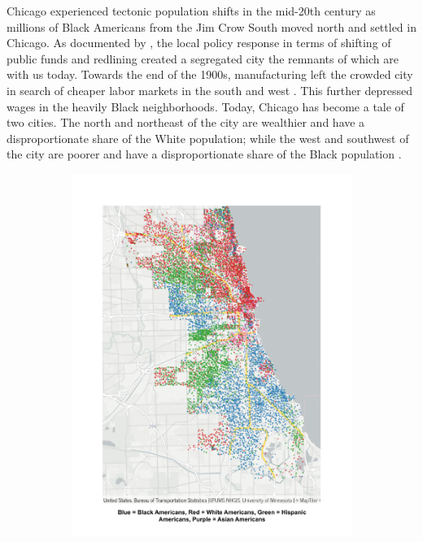 \documentclass[12pt]{article}
\begin{document}
Chicago experienced tectonic population shifts in the mid-20th century as millions of Black Americans from the Jim Crow South moved north and settled in Chicago. As documented by \citet{derenoncourt2022}, the local policy response in terms of shifting of public funds and redlining created a segregated city the remnants of which are with us today. Towards the end of the 1900s, manufacturing left the crowded city in search of cheaper labor markets in the south and west \citep{chicagobrit}. This further depressed wages in the heavily Black neighborhoods. Today, Chicago has become a tale of two cities. The north and northeast of the city are wealthier and have a disproportionate share of the White population; while the west and southwest of the city are poorer and have a disproportionate share of the Black population \citep{southside2022}. 
\begin{figure}[h!]
\centering
    \caption{Population by Race and Income}
    \begin{subfigure}{0.52\textwidth}
         \centering
         \includegraphics[width=\textwidth]{Pset1/Figures/Descriptive/racial_map.pdf}

\end{subfigure}
\end{figure}
\end{document}
